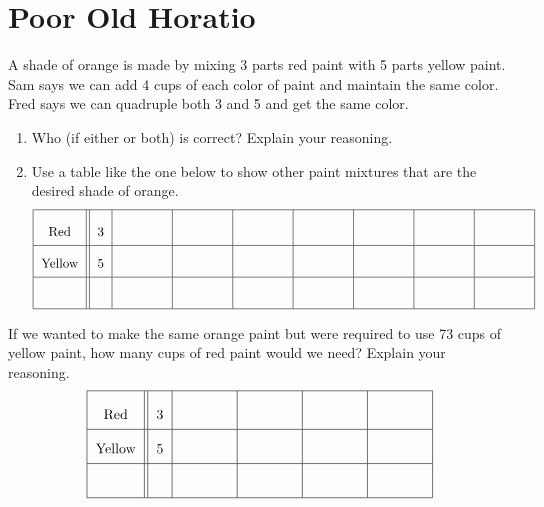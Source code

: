 \newpage
\section{Poor Old Horatio}\label{A:ratios}



\begin{prob}
A shade of orange is made by mixing 3 parts red paint with 5 parts
yellow paint.  Sam says we can add 4 cups of each color of paint and
maintain the same color.  Fred says we can quadruple both 3 and 5 and
get the same color.  
\begin{enumerate}
\item Who (if either or both) is correct?  Explain your reasoning.
\vspace{0.35in}

\item Use a table like the one below to show other paint mixtures that are the desired shade of orange. 
\[{\renewcommand{\arraystretch}{2}
\begin{tabular}{|c||c|c|c|c|c|c|c|c|}\hline
Red  &  3 &\rule[7mm]{12mm}{0mm} & \rule[7mm]{12mm}{0mm} & \rule[7mm]{12mm}{0mm}  & \rule[7mm]{12mm}{0mm}
 & \rule[7mm]{12mm}{0mm} & \rule[7mm]{12mm}{0mm} & \rule[7mm]{12mm}{0mm}   \\ \hline
Yellow & 5 &  &  &  & & & & \\ \hline
           &   &  &  &  & & & & \\ \hline
\end{tabular}}
\]
\end{enumerate}
\end{prob}


\begin{prob}
If we wanted to make the same orange paint but were required to use 73 cups of yellow paint, how
many cups of red paint would we need?  Explain your reasoning.  
\vspace{0.1in} 
\[{\renewcommand{\arraystretch}{2}
\begin{tabular}{|c||c|c|c|c|c|}\hline
Red  &  3 &\rule[7mm]{12mm}{0mm} &\rule[7mm]{12mm}{0mm} & \rule[7mm]{12mm}{0mm}  & \rule[7mm]{12mm}{0mm}   \\ \hline
Yellow & 5 &  &  &  & \\ \hline
           &   &   &    &  &  \\ \hline
\end{tabular}}
\]
\vspace{0.1in} 
\end{prob}



